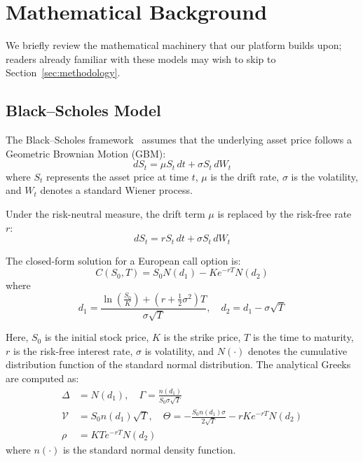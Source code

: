 \documentclass[conference]{IEEEtran}
\begin{document}
\section{Mathematical Background}\label{sec:math}

We briefly review the mathematical machinery that our platform builds upon; readers already familiar with these models may wish to skip to Section~\ref{sec:methodology}.

\subsection{Black--Scholes Model}

The Black--Scholes framework~\cite{b1} assumes that the underlying asset price follows a Geometric Brownian Motion (GBM):
\begin{equation}
    dS_t = \mu S_t \, dt + \sigma S_t \, dW_t
\end{equation}
where $S_t$ represents the asset price at time $t$, $\mu$ is the drift rate, $\sigma$ is the volatility, and $W_t$ denotes a standard Wiener process.

Under the risk-neutral measure, the drift term $\mu$ is replaced by the risk-free rate $r$:
\begin{equation}
    dS_t = r S_t \, dt + \sigma S_t \, dW_t
\end{equation}

The closed-form solution for a European call option is:
\begin{equation}
    C(S_0, T) = S_0 N(d_1) - K e^{-rT} N(d_2)
\end{equation}
where
\begin{equation}
    d_1 = \frac{\ln\left(\frac{S_0}{K}\right) + \left(r + \frac{1}{2}\sigma^2\right)T}{\sigma\sqrt{T}}, \quad d_2 = d_1 - \sigma\sqrt{T}
\end{equation}

Here, $S_0$ is the initial stock price, $K$ is the strike price, $T$ is the time to maturity, $r$ is the risk-free interest rate, $\sigma$ is volatility, and $N(\cdot)$ denotes the cumulative distribution function of the standard normal distribution. The analytical Greeks are computed as:
\begin{align}
    \Delta &= N(d_1), \quad \Gamma = \frac{n(d_1)}{S_0 \sigma \sqrt{T}} \\
    \mathcal{V} &= S_0 n(d_1) \sqrt{T}, \quad \Theta = -\frac{S_0 n(d_1) \sigma}{2\sqrt{T}} - rKe^{-rT}N(d_2) \\
    \rho &= KTe^{-rT}N(d_2)
\end{align}
where $n(\cdot)$ is the standard normal density function.
\end{document}
